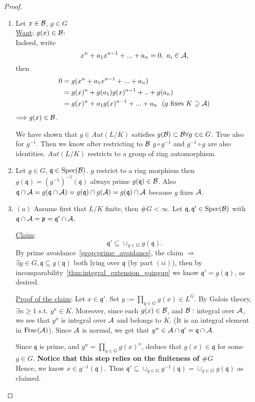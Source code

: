 \documentclass[11pt]{article}
\newcommand{\scp}{{\mathfrak p}}
\newcommand{\scq}{\mathfrak q}
\newcommand{\cala}{{\cal A}}
\newcommand{\calb}{{\cal B}}
\newcommand{\Lrta}{\Longrightarrow}
\begin{document}
\begin{proof}\ 
\begin{enumerate}[label=(\roman*)]
\item Let $x\in\calb$, $g\in G$\\
\underline{Want}: $g(x)\in\calb$:\\
Indeed, write
$$
x^n+a_1 x^{n-1}+...+a_n=0,\ a_i\in\cala,
$$ 
then
$$
\begin{aligned}
0&=g(x^n+a_1 x^{n-1}+...+a_n)\\
&=g(x)^n+g(a_1)g(x)^{n-1}+..+g(a_n)\\
&=g(x)^n+a_1g(x)^{n-1}+...+a_n \ \ (\text{$g$ fixes $K\supseteq \cala$})
\end{aligned}
$$
$\Lrta g(x)\in\calb$.

We have shown that $g\in Aut(L/K)$ satisfies $g(\calb)\subset\calb\forall g\in\in G$. True also for $g^{-1}$. Then we know after restricting to $\calb$ $g\circ g^{-1}$ and $g^{-1}\circ g$ are also identities. $Aut(L/K)$ restricts to a group of ring automorphism.

\item Let $g\in G$, $\scq\in\text{Spec}(\calb)$. $g$ restrict to a ring morphism then $g(\scq)=(g^{-1})^{-1}(\scq)$ always prime $g(\scq)\in\calb$. Also $\scq\cap\cala=g(\scq\cap\cala)=g(\scq)\cap g(\cala)=g(\scq)\cap\cala$ because $g$ fixes $\cala$.

\item $(a)$ Assume first that $L/K$ finite, then $\#G<\infty$. Let $\scq,\scq'\in \text{Spec}(\calb)$ with $\scq\cap\cala=\scp=\scq'\cap\cala$. 

\underline{Claim}:
$$
\scq'\subseteq\cup_{g\in G}g(\scq).
$$
By prime avoidance~\ref{prop:prime_avoidance}, the claim $\Lrta$ $\exists g\in G,\scq\subseteq g(\scq)$ both lying over $\scq$ (by part $(ii)$), then by incomparability~\ref{thm:integral_extension_goingup} we know $\scq'=g(\scq)$, as desired.

\underline{Proof of the claim}: Let $x\in \scq'$. Set $y:=\prod_{g\in G}g(x)\in L^G$.
By Galois theory, $\exists n\geq 1$ s.t. $y^n\in K$. Moreover, since each $g(x)\in\calb$, and $\calb:$ integral over $\cala$, we see that $y^n$ is integral over $\cala$ and belongs to $K$. (It is an integral element in $\text{Frac}(\cala)$). Since $\cala$ is normal, we get that $y^n\in \cala\cap\scq'=\scq\cap\cala$.

Since $\scq$ is prime, and $y^n=\prod_{g\in G}g(x)^n$, deduce that $g(x)\in\scq$ for some $g\in G$. \textbf{Notice that this step relies on the finiteness of $\#G$}\\
 Hence, we know $x\in g^{-1}(\scq)$. Thus $\scq'\subseteq \cup_{g\in G}g^{-1}(\scq)=\cup_{g\in G}g(\scq)$ as claimed.


\end{enumerate}
\end{proof}
\end{document}
